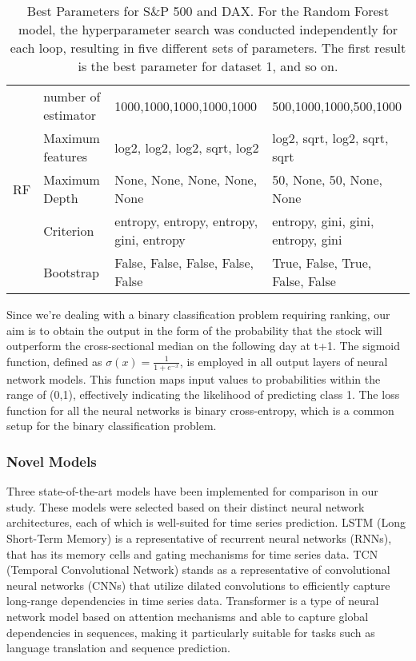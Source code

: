 \documentclass{article}
\begin{document}
\begin{table}[!h]
\begin{tabular}{|p{1.8cm}|p{3.8cm}|p{4.5cm}|p{4.5cm}|}
\multirow{5}{*}{RF} & number of estimator & 1000,1000,1000,1000,1000 & 500,1000,1000,500,1000 \\\cline{2-4}
                    & Maximum features & log2, log2, log2, sqrt, log2 & log2, sqrt, log2, sqrt, sqrt \\ \cline{2-4}
                      & Maximum Depth      & None, None, None, None, None & 50, None, 50, None, None  \\ \cline{2-4}
                      & Criterion     & entropy, entropy, entropy, gini, entropy & entropy, gini, gini, entropy, gini \\ \cline{2-4}
                      & Bootstrap          & False, False, False, False, False & True, False, True, False, False  \\  \hline
\end{tabular}
\caption{Best Parameters for S\&P 500 and DAX. For the Random Forest model, the hyperparameter search was conducted independently for each loop, resulting in five different sets of parameters. The first result is the best parameter for dataset 1, and so on.}
\label{table:best_parameter}
\end{table}
Since we're dealing with a binary classification problem requiring ranking, our aim is to obtain the output in the form of the probability that the stock will outperform the cross-sectional median on the following day at t+1. The sigmoid function, defined as $\sigma(x) = \frac{1}{1+e^{-x}}$, is employed in all output layers of neural network models. This function maps input values to probabilities within the range of (0,1), effectively indicating the likelihood of predicting class 1. The loss function for all the neural networks is binary cross-entropy, which is a common setup for the binary classification problem. 

\subsubsection{Novel Models}
Three state-of-the-art models have been implemented for comparison in our study. These models were selected based on their distinct neural network architectures, each of which is well-suited for time series prediction. LSTM (Long Short-Term Memory) is a representative of recurrent neural networks (RNNs), that has its memory cells and gating mechanisms for time series data. TCN (Temporal Convolutional Network) stands as a representative of convolutional neural networks (CNNs) that utilize dilated convolutions to efficiently capture long-range dependencies in time series data. Transformer is a type of neural network model based on attention mechanisms and able to capture global dependencies in sequences, making it particularly suitable for tasks such as language translation and sequence prediction. 
\end{document}

